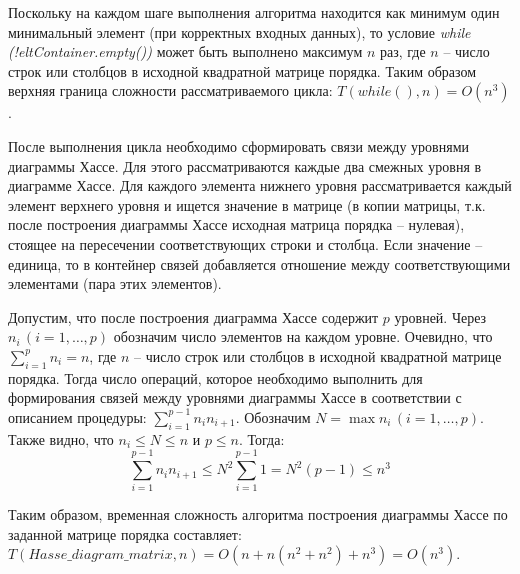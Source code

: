 \documentclass[spec, och, otchet, hidelinks]{SCWorks}
\begin{document}
\par Поскольку на каждом шаге выполнения алгоритма находится как минимум один
минимальный элемент (при корректных входных данных), то условие
\textit{while (!eltContainer.empty())} может быть выполнено максимум $n$ раз,
где $n$ -- число строк или столбцов в исходной квадратной матрице порядка. Таким
образом верхняя граница сложности рассматриваемого цикла: $T(while(), n) = O(n^3)$.

\par После выполнения цикла необходимо сформировать связи между уровнями
диаграммы Хассе. Для этого рассматриваются каждые два смежных уровня в диаграмме
Хассе. Для каждого элемента нижнего уровня рассматривается каждый элемент
верхнего уровня и ищется значение в матрице (в копии матрицы, т.к. после
построения диаграммы Хассе исходная матрица порядка -- нулевая), стоящее на пересечении
соответствующих строки и столбца. Если значение -- единица, то в
контейнер связей добавляется отношение между соответствующими элементами (пара
этих элементов).

\par Допустим, что после построения диаграмма Хассе содержит $p$
уровней. Через $n_i \, (i = 1,\dots,p)$ обозначим число элементов на каждом
уровне. Очевидно, что $\sum_{i = 1}^{p} n_i = n$, где $n$ -- число строк или
столбцов в исходной квадратной матрице порядка. Тогда число операций, которое
необходимо выполнить для формирования связей между уровнями диаграммы Хассе в
соответствии с описанием процедуры: $\sum_{i = 1}^{p - 1} n_i n_{i + 1}$.
Обозначим $N = \max n_i \, (i = 1,\dots,p).$ Также видно, что $n_i \leq N \leq
n$ и $p \leq n$. Тогда: $$ \sum_{i = 1}^{p - 1} n_i n_{i + 1} \leq N^2 \sum_{i =
  1}^{p - 1} 1 = N^2 (p - 1) \leq n^3$$

\par Таким образом, временная сложность
алгоритма построения диаграммы Хассе по заданной матрице порядка составляет:
$T(Hasse\_diagram\_matrix, n) = O(n + n(n^2 + n^2) + n^3) = O(n^3).$

\newpage
\end{document}
